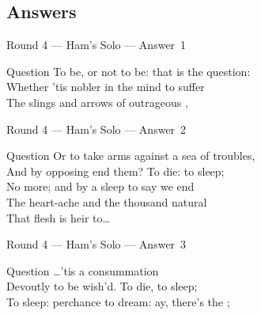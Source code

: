 \documentclass[11pt]{beamer}
\begin{document}
\subsection{Answers}
\begin{frame}[t]{Round 4 --- Ham's Solo --- \mbox{Answer 1}}
\vspace{-0.5em}
\begin{block}{Question}
To be, or not to be: that is the question:\\
Whether 'tis nobler in the mind to suffer\\
The slings and arrows of outrageous \textunderscore{}\textunderscore{}\textunderscore{}\textunderscore{}\textunderscore{},
\end{block}
\end{frame}
\begin{frame}[t]{Round 4 --- Ham's Solo --- \mbox{Answer 2}}
\vspace{-0.5em}
\begin{block}{Question}
Or to take arms against a sea of troubles,\\
And by opposing end them? To die: to sleep;\\
No more; and by a sleep to say we end\\
The heart-ache and the thousand natural \textunderscore{}\textunderscore{}\textunderscore{}\textunderscore{}\textunderscore{}\\
That flesh is heir to\ldots{}
\end{block}
\end{frame}
\begin{frame}[t]{Round 4 --- Ham's Solo --- \mbox{Answer 3}}
\vspace{-0.5em}
\begin{block}{Question}
\ldots{}'tis a consummation\\
Devoutly to be wish'd. To die, to sleep;\\
To sleep: perchance to dream: ay, there's the \textunderscore{}\textunderscore{}\textunderscore{}\textunderscore{}\textunderscore{};
\end{block}
\end{frame}
\end{document}
